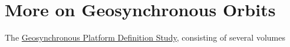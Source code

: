 % 

\section{More on Geosynchronous Orbits}
The \href{https://ntrs.nasa.gov/search?q=Geosynchronous\%20platform\%20definition\%20study&page=\%7B\%22from\%22:0,\%22size\%22:25\%7D}{Geosynchronous Platform Definition Study}, consisting of several volumes 
\cite{Myers1973_ExecSummary, Myers1973_StudySummary, Myers1973_BaselineTraffic, 
      Myers1973_PlatformSynthesis, Myers1973_TransportationRequirements, 
      Myers1973_ProgramEvaluation}
\endinput  %
[Executive Summary, Vols. I, II, III, IVa, IVb,V,VI]

